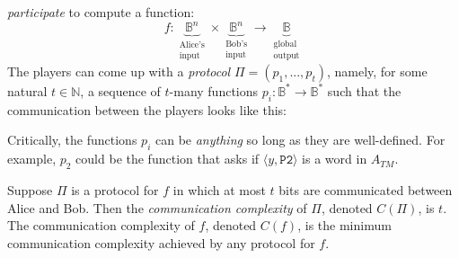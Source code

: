 \documentclass[12pt]{article}
\begin{document}
\emph{participate} to compute a function:
\[f : \underbrace{\mathbb{B}^n}_{\begin{aligned}\text{Alice's}\\\text{input}\end{aligned}} \times 
      \underbrace{\mathbb{B}^n}_{\begin{aligned}\text{Bob's}\\\text{input}\end{aligned}} \to 
      \underbrace{\mathbb{B}}_{\begin{aligned}\text{global}\\\text{output}\end{aligned}}\]
The players can come up with a \emph{protocol} 
\(\Pi = (p_1, ..., p_t)\),
namely, 
	for some natural $t \in \mathbb{N}$,
	a sequence of $t$-many functions
\(p_i : \mathbb{B}^* \to \mathbb{B}^*\)
such that the communication between the players looks like this:\\
\noindent\hfill\par
\noindent{}
Critically, the functions $p_i$ can be \emph{anything} so long as they are well-defined.
For example, $p_2$ could be the function that asks if $\langle y, \texttt{P2} \rangle$ is a word in $A_{TM}$.
\clearpage
\begin{definition}
Suppose $\Pi$ is a protocol for $f$ in which at most $t$
bits are communicated between Alice and Bob.
Then the \emph{communication complexity} of $\Pi$,
	denoted $C(\Pi)$, is $t$.
The communication complexity of $f$, denoted $C(f)$,
	is the minimum communication complexity
	achieved by any protocol for $f$.
\end{definition}
\end{document}
